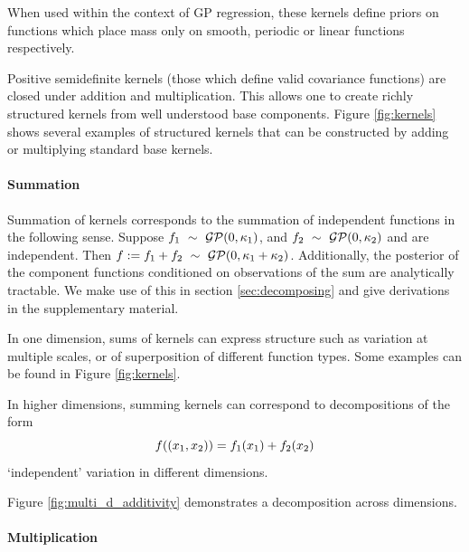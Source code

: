 \documentclass[twoside]{article}
\begin{document}
When used within the context of GP regression, these kernels define priors on functions which place mass only on smooth, periodic or linear functions respectively.

Positive semidefinite kernels (\ie those which define valid covariance functions) are closed under addition and multiplication.
This allows one to create richly structured kernels from well understood base components.  Figure \ref{fig:kernels} shows several examples of structured kernels that can be constructed by adding or multiplying standard base kernels.




\paragraph{Summation}

Summation of kernels corresponds to the summation of independent functions in the following sense.
Suppose ${f_1 \ \sim\  \mathcal{GP}(0, \kappa_1)}$, and ${f_2 \ \sim\  \mathcal{GP}(0, \kappa_2)}$ and are independent.
Then ${f := f_1 + f_2 \ \sim\  \mathcal{GP}(0, \kappa_1 + \kappa_2)}$.
Additionally, the posterior of the component functions conditioned on observations of the sum are analytically tractable. We make use of this in section \ref{sec:decomposing} and give derivations in the supplementary material.

In one dimension, sums of kernels can express structure such as variation at multiple scales, or of superposition of different function types.  Some examples can be found in Figure \ref{fig:kernels}.

In higher dimensions, summing kernels can correspond to decompositions of the form
\begin{equation}
f((x_1, x_2)) = f_1(x_1) + f_2(x_2)
\end{equation}
\ie `independent' variation in different dimensions.
%

%
Figure \ref{fig:multi_d_additivity} demonstrates a decomposition across dimensions.


\paragraph{Multiplication}
\end{document}
